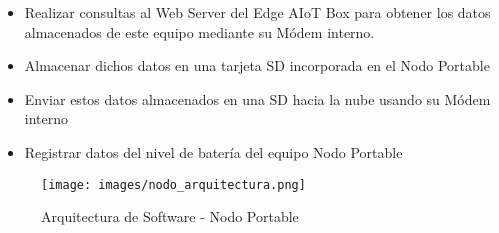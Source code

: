 \begin{itemize}
    \item   Realizar consultas al Web Server del Edge AIoT Box 
            para obtener los datos almacenados de este equipo mediante su Módem interno.
    \item   Almacenar dichos datos en una tarjeta SD incorporada en el Nodo Portable
    \item   Enviar estos datos almacenados en una SD hacia la nube usando su Módem interno
    \item   Registrar datos del nivel de batería del equipo Nodo Portable
\end{itemize}

\begin{figure}[H]
    \centering
    \texttt{[image: images/nodo\_arquitectura.png]}
    \captionsetup{font=footnotesize}
    \caption{Arquitectura de Software - Nodo Portable}
    \label{fig:img3}
\end{figure}

